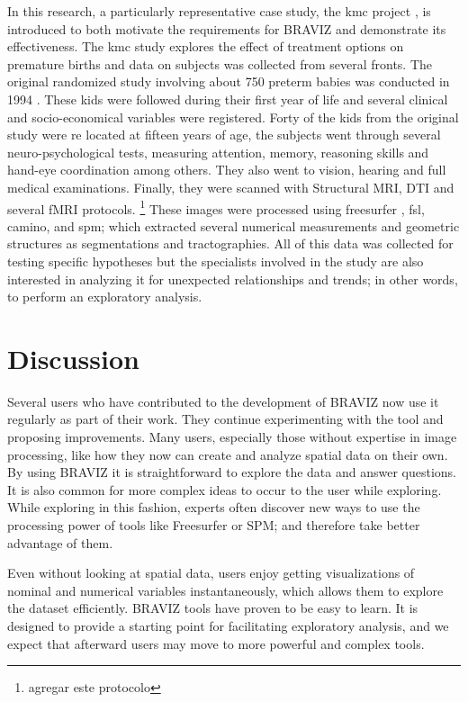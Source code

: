 \documentclass[utf8,paper]{frontiersSCNS} %
\begin{document}
In this research, a particularly representative case study, the kmc project \cite{schneider_cerebral_2012}, is introduced to both motivate the requirements for BRAVIZ and demonstrate its effectiveness. The kmc study explores the effect of treatment options on premature births and data on subjects was collected from several fronts. The original randomized study involving about 750 preterm babies was conducted in 1994 \citep{charpak_kangaroo_1997}. These kids were followed during their first year \citep{charpak_randomized_2001, tessier_kangaroo_2009} of life and several clinical and socio-economical variables were registered. Forty of the kids from the original study were re located at fifteen years of age, the  subjects went through several neuro-psychological tests, measuring attention, memory, reasoning skills and hand-eye coordination among others. They also went to vision, hearing and full medical examinations. Finally, they were scanned with Structural MRI, DTI and several fMRI protocols. \footnote{agregar este protocolo} These images were processed using freesurfer \citep{fischl_freesurfer_2012}, fsl\citep{jenkinson_fsl_2012}, camino\citep{cook_camino:_2006}, and spm\citep{friston_statistical_2006}; which extracted several numerical measurements and geometric structures as segmentations and tractographies. All of this data was collected for testing specific hypotheses but the specialists involved in the study are also interested in analyzing it for unexpected relationships and trends; in other words, to perform an exploratory analysis\citep{tukey_we_1980}.

\section{Discussion}
\label{sec:disc}
Several users who have contributed to the development of BRAVIZ now use it regularly as part of their work. They continue experimenting with the tool and proposing improvements. Many users, especially those without expertise in image processing, like how they now can create and analyze spatial data on their own.  By using BRAVIZ it is straightforward to explore the data and answer questions. It is also common for more complex ideas to occur to the user while exploring. While exploring in this fashion, experts often discover new ways to use the processing power of tools like Freesurfer or SPM; and therefore take better advantage of them.

Even without looking at spatial data, users enjoy getting visualizations of nominal and numerical variables instantaneously, which allows them to explore the dataset efficiently. BRAVIZ tools have proven to be easy to learn. It is designed to provide a starting point for facilitating exploratory analysis, and we expect that afterward users may move to more powerful and complex tools.
\end{document}
